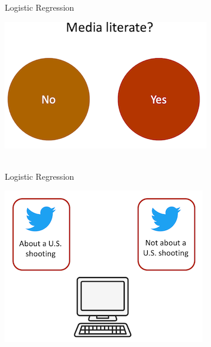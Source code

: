 \documentclass[compress]{beamer}
\begin{document}
\begin{frame}{Logistic Regression}
	
\begin{center}
	\includegraphics{../pictures/medialiteracydummy.png} \\\
\end{center}
\end{frame}


\begin{frame}{Logistic Regression}
	
\begin{center}
	\includegraphics{../pictures/Zhangetal_1.png} \\\
\end{center}
	
\begin{tiny}
\end{tiny}
\end{frame}
\end{document}
